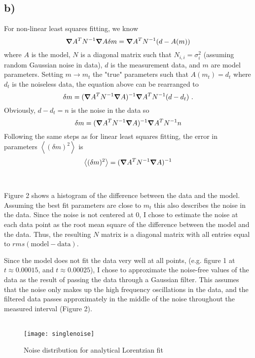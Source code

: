 \documentclass{article}
\newcommand{\<}[1]{\left\langle #1 \right\rangle }
\begin{document}
\subsection{b)}
For non-linear least squares fitting, we know
\[\grad A^T N^{-1}\grad A \delta m = \grad A^T N^{-1} (d - A(m))\]
where $A$ is the model, $N$ is a diagonal matrix such that $N_{i,i} = \sigma^2_i$ (assuming random Gaussian noise in data), $d$ is the measurement data, and $m$ are model parameters. Setting $m \to m_t$ the "true" parameters such that $A(m_t) = d_t$ where $d_t$ is the noiseless data, the equation above can be rearranged to 
\[\delta m = (\grad A^T N^{-1} \grad A)^{-1} \grad A^T N^{-1} (d-d_t) \text{ .}\]
Obviously, $d-d_t = n$ is the noise in the data so
\[\delta m = (\grad A^T N^{-1} \grad A)^{-1} \grad A^T N^{-1} n \]
Following the same steps as for linear least squares fitting, the error in parameters $\<{(\delta m)^2}$ is 
\[\<{(\delta m)^2} = (\grad A^T N^{-1} \grad A)^{-1} \]\\
\\
Figure 2 shows a histogram of the difference between the data and the model. Assuming the best fit parameters are close to $m_t$ this also describes the noise in the data. Since the noise is not centered at 0, I chose to estimate the noise at each data point as the root mean square of the difference between the model and the data. Thus, the resulting $N$ matrix is a diagonal matrix with all entries equal to $rms(\text{model} - \text{data})$.

Since the model does not fit the data very well at all points, (e.g. figure 1 at $t\approx 0.00015$, and $t\approx 0.00025$), I chose to approximate the noise-free values of the data as the result of passing the data through a Gaussian filter. This assumes that the noise only makes up the high frequency oscillations in the data, and the filtered data passes approximately in the middle of the noise throughout the measured interval (Figure 2). \\
\\

\begin{figure}[h]
	\caption{Noise distribution for analytical Lorentzian fit}
	\centering
	\texttt{[image: singlenoise]}
\end{figure}
\\
\end{document}
